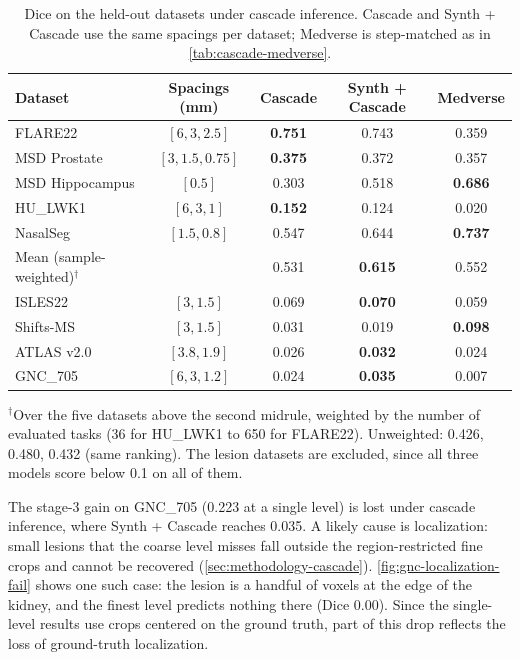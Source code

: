 \begin{table}[t]
  \centering
  \small
  \caption{Dice on the held-out datasets under cascade inference. Cascade and
  Synth + Cascade use the same spacings per dataset; Medverse is step-matched
  as in \autoref{tab:cascade-medverse}.}
  \label{tab:synth-cascade-realhost}
  \begin{tabular}{@{}lcccc@{}}
    \toprule
    Dataset & Spacings (mm) & Cascade & Synth + Cascade & Medverse \\
    \midrule
    FLARE22         & $[6, 3, 2.5]$    & \textbf{0.751} & 0.743 & 0.359 \\
    MSD Prostate    & $[3, 1.5, 0.75]$ & \textbf{0.375} & 0.372 & 0.357 \\
    MSD Hippocampus & $[0.5]$          & 0.303 & 0.518 & \textbf{0.686} \\
    HU\_LWK1        & $[6, 3, 1]$      & \textbf{0.152} & 0.124 & 0.020 \\
    NasalSeg        & $[1.5, 0.8]$     & 0.547 & 0.644 & \textbf{0.737} \\
    \midrule
    Mean (sample-weighted)$^{\dagger}$ & & 0.531 & \textbf{0.615} & 0.552 \\
    \midrule
    ISLES22         & $[3, 1.5]$       & 0.069 & \textbf{0.070} & 0.059 \\
    Shifts-MS       & $[3, 1.5]$       & 0.031 & 0.019 & \textbf{0.098} \\
    ATLAS v2.0      & $[3.8, 1.9]$     & 0.026 & \textbf{0.032} & 0.024 \\
    GNC\_705        & $[6, 3, 1.2]$    & 0.024 & \textbf{0.035} & 0.007 \\
    \bottomrule
  \end{tabular}
  \par\vspace{0.5em}
  \raggedright\footnotesize
  $^{\dagger}$Over the five datasets above the second midrule, weighted by the
  number of evaluated tasks (36 for HU\_LWK1 to 650 for FLARE22). Unweighted:
  0.426, 0.480, 0.432 (same ranking). The lesion datasets are excluded, since
  all three models score below 0.1 on all of them.
\end{table}

The stage-3 gain on GNC\_705 (0.223 at a single level) is lost under cascade
inference, where Synth + Cascade reaches 0.035. A likely cause is
localization: small lesions that the coarse level misses fall outside the
region-restricted fine crops and cannot be recovered
(\autoref{sec:methodology-cascade}). \autoref{fig:gnc-localization-fail} shows
one such case: the lesion is a handful of voxels at the edge of the kidney,
and the finest level predicts nothing there (Dice 0.00). Since the single-level results use crops centered on the ground truth, part of this drop reflects the loss of ground-truth localization.

